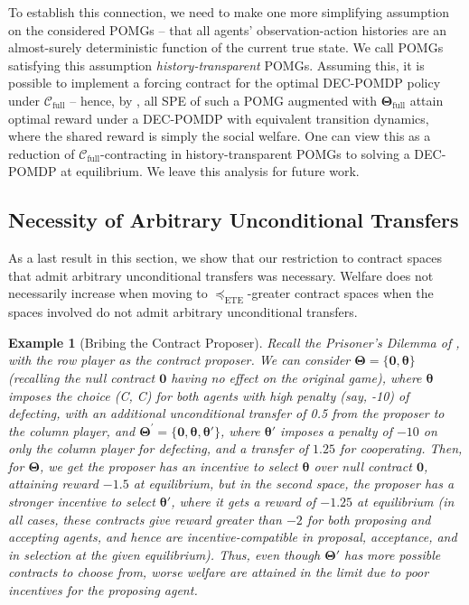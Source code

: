 \documentclass[referee,sn-basic]{sn-jnl}
\newcommand{\bld}[1]{\boldsymbol{#1}}
\newcommand{\btheta}{\boldsymbol{\theta}}
\newcommand{\bTheta}{\boldsymbol{\Theta}}
\theoremstyle{thmstyleone}%
\theoremstyle{thmstyletwo}%
\newtheorem{example}{Example}%
\theoremstyle{thmstylethree}%
\begin{document}
To establish this connection, we need to make one more simplifying assumption on the considered POMGs -- that all agents' observation-action histories are an almost-surely deterministic function of the current true state. We call POMGs satisfying this assumption \textit{history-transparent} POMGs. Assuming this, it is possible to implement a forcing contract for the optimal DEC-POMDP policy under $\mathcal{C}_{\operatorname{full}}$ -- hence, by , all SPE of such a POMG augmented with $\bld \Theta_{\operatorname{full}}$ attain optimal reward under a DEC-POMDP with equivalent transition dynamics, where the shared reward is simply the social welfare. One can view this as a reduction of $\mathcal{C}_{\operatorname{full}}$-contracting in history-transparent POMGs to solving a DEC-POMDP at equilibrium. We leave this analysis for future work.

\subsection{Necessity of Arbitrary Unconditional Transfers}

As a last result in this section, we show that our restriction to contract spaces that admit arbitrary unconditional transfers was necessary. Welfare does not necessarily increase when moving to $\preceq_{\text{ETE}}$-greater contract spaces when the spaces involved do not admit arbitrary unconditional transfers.

\begin{example}[Bribing the Contract Proposer]
    Recall the Prisoner's Dilemma of , with the row player as the contract proposer. We can consider $\bTheta = \{\mathbf{0}, \btheta\}$ (recalling the null contract $\mathbf{0}$ having no effect on the original game), where $\btheta$ imposes the choice (C, C) for both agents with high penalty (say, -10) of defecting, with an additional unconditional transfer of 0.5 from the proposer to the column player, and $\bTheta^\prime = \{\mathbf{0}, \btheta, \btheta'\}$, where $\btheta'$ imposes a penalty of $-10$ on only the column player for defecting, and a transfer of $1.25$ for cooperating. Then, for $\bTheta$, we get the proposer has an incentive to select $\btheta$ over null contract $\mathbf{0}$, attaining reward $-1.5$ at equilibrium, but in the second space, the proposer has a stronger incentive to select $\btheta'$, where it gets a reward of $-1.25$ at equilibrium (in all cases, these contracts give reward greater than $-2$ for both proposing and accepting agents, and hence are incentive-compatible in proposal, acceptance, and in selection at the given equilibrium). Thus, even though $\bTheta'$ has more possible contracts to choose from, worse welfare are attained in the limit due to poor incentives for the proposing agent.
\end{example}
\end{document}
